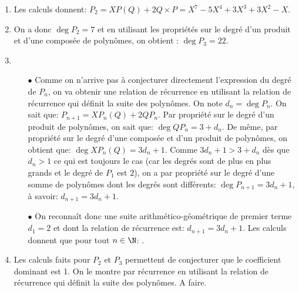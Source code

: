 \documentclass[a4paper, 11pt,reqno]{article}
\begin{document}
\begin{correction}  \;
	\begin{enumerate}
		\item Les calculs donnent: $P_2=XP(Q)+2Q\times P=X^7-5X^4+3X^3+3X^2-X$.
		\item On a donc $\deg{P_2}=7$ et en utilisant les propri\'et\'es sur le degr\'e d'un produit et d'une compos\'ee de polyn\^omes, on obtient : $\deg{P_3}=22$.
		\item
		      \begin{itemize}
			      \item[$\bullet$] Comme on n'arrive pas \`{a} conjecturer directement l'expression du degr\'e de $P_n$, on va obtenir une relation de r\'ecurrence en utilisant la relation de r\'ecurrence qui d\'efinit la suite des polyn\^{o}mes. On note $d_n=\deg{P_n}$. On sait que: $P_{n+1}=XP_n(Q)+2QP_n$. Par propri\'et\'e sur le degr\'e d'un produit de polyn\^{o}mes, on sait que:
			            $\deg{QP_n}=3+d_n$. De m\^{e}me, par propri\'et\'e sur le degr\'e d'une compos\'ee et d'un produit de polyn\^{o}mes, on obtient que: $\deg{XP_n(Q)}=3d_n+1$. Comme $3d_n+1> 3+d_n$ d\`{e}s que $d_n>1$ ce qui est toujours le cas (car les degr\'es sont de plus en plus grands et le degr\'e de $P_1$ est $2$), on a par propri\'et\'e sur le degr\'e d'une somme de polyn\^{o}mes dont les degr\'es sont diff\'erents: $\deg{P_{n+1}}=3d_n+1$, \`{a} savoir: $d_{n+1}=3d_n+1$.
			      \item[$\bullet$] On reconna\^{i}t donc une suite arithm\'etico-g\'eom\'etrique de premier terme $d_1=2$ et dont la relation de r\'ecurrence est: $d_{n+1}=3d_n+1$. Les calculs donnent que pour tout $n\in\N$: .
		      \end{itemize}
		\item Les calculs faits pour $P_2$ et $P_3$ permettent de conjecturer que le coefficient dominant est 1. On le montre par r\'ecurrence en utilisant la relation de r\'ecurrence qui d\'efinit la suite des polyn\^{o}mes. A faire.
	\end{enumerate}
\end{correction}
\end{document}
